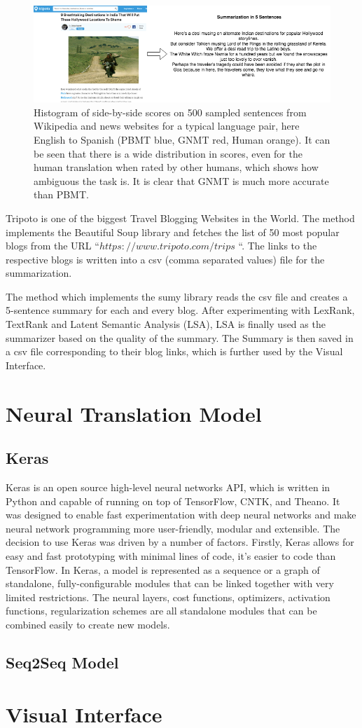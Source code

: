 \begin{figure}
\includegraphics[width=\textwidth]{figures/textsummary.png}
\caption{Histogram of side-by-side scores on 500 sampled sentences from Wikipedia and news websites for a
typical language pair, here English to Spanish (PBMT blue, GNMT red, Human orange). It can be seen that
there is a wide distribution in scores, even for the human translation when rated by other humans, which
shows how ambiguous the task is. It is clear that GNMT is much more accurate than PBMT.} \label{fig1}
\end{figure}
Tripoto is one of the biggest Travel Blogging Websites in the World. The method implements the Beautiful Soup library and fetches the list of 50 most popular blogs from the URL “$https://www.tripoto.com/trips$ “. The links to the respective blogs is written into a csv (comma separated values) file for the summarization.

The method which implements the sumy library reads the csv file and creates a 5-sentence summary for each and every blog. After experimenting with LexRank, TextRank and Latent Semantic Analysis (LSA), LSA is finally used as the summarizer based on the quality of the summary. The Summary is then saved in a csv file corresponding to their blog links, which is further used by the Visual Interface. 

\section{Neural Translation Model}
\subsection{Keras}
Keras is an open source high-level neural networks API, which is written in Python and capable of running on top of TensorFlow, CNTK, and Theano.  It was designed to enable fast experimentation with deep neural networks and make neural network programming more user-friendly, modular and extensible. The decision to use Keras was driven by a number of factors. Firstly, Keras allows for easy and fast prototyping with minimal lines of code, it’s easier to code than TensorFlow.  In Keras, a model is represented as a sequence or a graph of standalone, fully-configurable modules that can be linked together with very limited restrictions. The neural layers, cost functions, optimizers, activation functions, regularization schemes are all standalone modules that can be combined easily to create new models. 
\subsection{Seq2Seq Model}
\section{Visual Interface}
